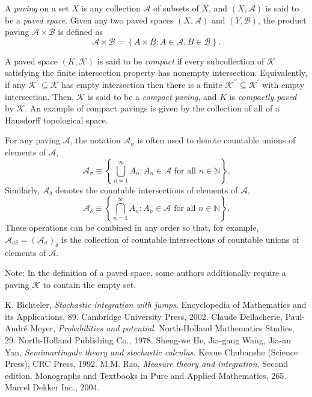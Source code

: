 \documentclass[12pt]{article}
\begin{document}

A \emph{paving} on a set $X$ is any collection $\mathcal{A}$ of subsets of $X$, and $(X,\mathcal{A})$ is said to be a \emph{paved space}.
Given any two paved spaces $(X,\mathcal{A})$ and $(Y,\mathcal{B})$, the product paving $\mathcal{A}\times\mathcal{B}$ is defined as
\begin{equation*}
\mathcal{A}\times\mathcal{B} = \left\{A\times B\colon A\in\mathcal{A},B\in\mathcal{B}\right\}.
\end{equation*}

A paved space $(K,\mathcal{K})$ is said to be \emph{compact} if every subcollection of $\mathcal{K}$ satisfying the finite intersection property has nonempty intersection. Equivalently, if any $\mathcal{K}^\prime\subseteq\mathcal{K}$ has empty intersection then there is a finite $\mathcal{K}^{\prime\prime}\subseteq\mathcal{K}^\prime$ with empty intersection. Then, $\mathcal{K}$ is said to be a \emph{compact paving}, and $K$ is \emph{compactly paved} by $\mathcal{K}$.
An example of compact pavings is given by the collection of all  of a Hausdorff topological space.

For any paving $\mathcal{A}$, the notation $\mathcal{A}_\sigma$ is often used to denote countable unions of elements of $\mathcal{A}$,
\begin{equation*}
\mathcal{A}_\sigma\equiv\left\{\bigcup_{n=1}^\infty A_n\colon A_n\in\mathcal{A}\text{ for all }n\in\mathbb{N}\right\}.
\end{equation*}
Similarly, $\mathcal{A}_\delta$ denotes the countable intersections of elements of $\mathcal{A}$,
\begin{equation*}
\mathcal{A}_\delta\equiv\left\{\bigcap_{n=1}^\infty A_n\colon A_n\in\mathcal{A}\text{ for all }n\in\mathbb{N}\right\}.
\end{equation*}
These operations can be combined in any order so that, for example, $\mathcal{A}_{\sigma\delta}=(\mathcal{A}_\sigma)_\delta$ is the collection of countable intersections of countable unions of elements of $\mathcal{A}$.

Note: In the definition of a paved space, some authors additionally require a paving $\mathcal{K}$ to contain the empty set.

\begin{thebibliography}{9}
K. Bichteler, \emph{Stochastic integration with jumps}. Encyclopedia of Mathematics and its Applications, 89. Cambridge University Press, 2002.
Claude Dellacherie, Paul-Andr\'e Meyer, \emph{Probabilities and potential}. North-Holland Mathematics Studies, 29. North-Holland Publishing Co., 1978.
Sheng-we He, Jia-gang Wang, Jia-an Yan, \emph{Semimartingale theory and stochastic calculus.} Kexue Chubanshe (Science Press), CRC Press, 1992.
M.M. Rao, \emph{Measure theory and integration}. Second edition. Monographs and Textbooks in Pure and Applied Mathematics, 265. Marcel Dekker Inc., 2004.
\end{thebibliography}

\end{document}

